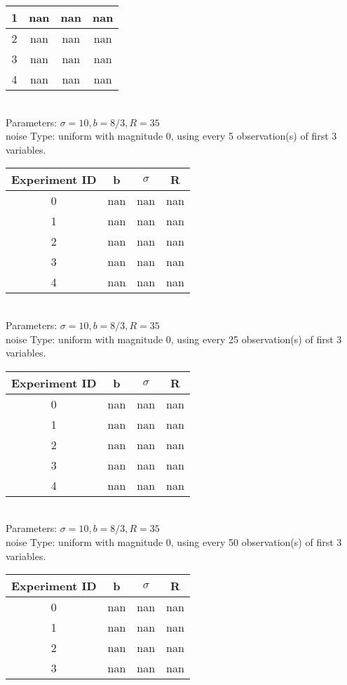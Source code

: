 \begin{multicols}{3}
\begin{tabular}{cccc}
 1 & nan & nan & nan\\ \hline 
 2 & nan & nan & nan\\ \hline 
 3 & nan & nan & nan\\ \hline 
 4 & nan & nan & nan\\ \hline 
 \end{tabular}\\
Parameters: $\sigma=10, b=8/3, R=35$\\
noise Type: uniform with magnitude 0, using every 5 observation(s) of first 3 variables.\\
\begin{tabular}{cccc}
\hline Experiment ID & b & $\sigma$ & R \\ \hline 
0 & nan & nan & nan\\ \hline 
 1 & nan & nan & nan\\ \hline 
 2 & nan & nan & nan\\ \hline 
 3 & nan & nan & nan\\ \hline 
 4 & nan & nan & nan\\ \hline 
 \end{tabular}\\
Parameters: $\sigma=10, b=8/3, R=35$\\
noise Type: uniform with magnitude 0, using every 25 observation(s) of first 3 variables.\\
\begin{tabular}{cccc}
\hline Experiment ID & b & $\sigma$ & R \\ \hline 
0 & nan & nan & nan\\ \hline 
 1 & nan & nan & nan\\ \hline 
 2 & nan & nan & nan\\ \hline 
 3 & nan & nan & nan\\ \hline 
 4 & nan & nan & nan\\ \hline 
 \end{tabular}\\
Parameters: $\sigma=10, b=8/3, R=35$\\
noise Type: uniform with magnitude 0, using every 50 observation(s) of first 3 variables.\\
\begin{tabular}{cccc}
\hline Experiment ID & b & $\sigma$ & R \\ \hline 
0 & nan & nan & nan\\ \hline 
 1 & nan & nan & nan\\ \hline 
 2 & nan & nan & nan\\ \hline 
 3 & nan & nan & nan\\ \hline 

\end{tabular}
\end{multicols}
